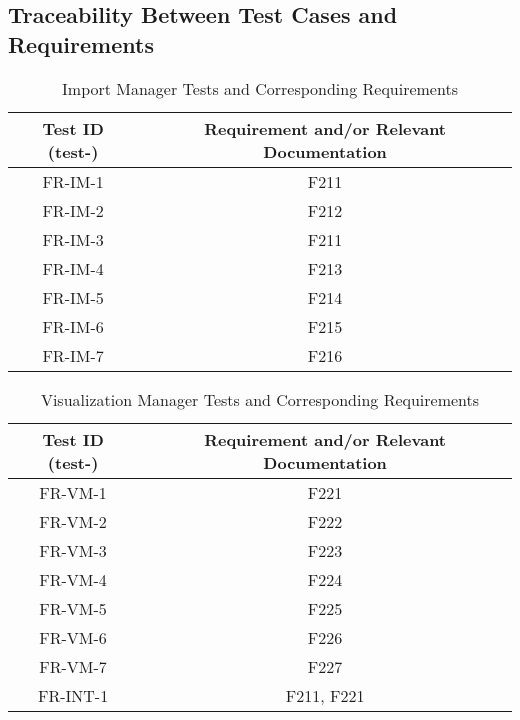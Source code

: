 \documentclass[12pt, titlepage]{article}
\begin{document}
\newpage

\subsection{Traceability Between Test Cases and Requirements}

\iffalse
\wss{Provide a table that shows which test cases are supporting which
  requirements.}
\fi

\begin{table}[h!]
  \centering
  \caption{Import Manager Tests and Corresponding Requirements}
  \begin{tabular}{c c}
    \hline
    \textbf{Test ID (test-)} & \textbf{Requirement and/or Relevant Documentation} \\ \hline
    FR-IM-1 & F211\\
    FR-IM-2 & F212\\
    FR-IM-3 & F211\\
    FR-IM-4 & F213\\
    FR-IM-5 & F214\\
    FR-IM-6 & F215\\
    FR-IM-7 & F216\\
  \end{tabular}
\end{table}

\begin{table}[h!]
  \centering
  \caption{Visualization Manager Tests and Corresponding Requirements}
  \begin{tabular}{c c}
    \hline
    \textbf{Test ID (test-)} & \textbf{Requirement and/or Relevant Documentation} \\ \hline
    FR-VM-1 & F221\\
    FR-VM-2 & F222\\
    FR-VM-3 & F223\\
    FR-VM-4 & F224\\
    FR-VM-5 & F225\\
    FR-VM-6 & F226\\
    FR-VM-7 & F227\\
    FR-INT-1 & F211, F221\\
  \end{tabular}
\end{table}
\end{document}
